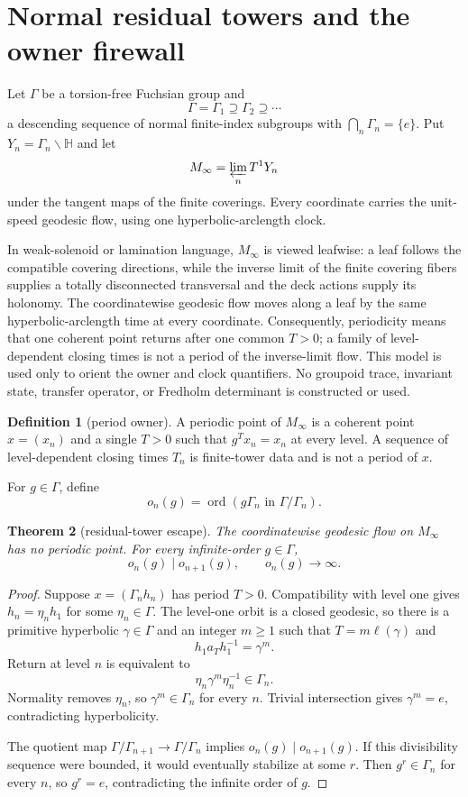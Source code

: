 \documentclass[11pt]{article}
\newtheorem{theorem}{Theorem}[section]
\theoremstyle{definition}
\newtheorem{definition}[theorem]{Definition}
\theoremstyle{remark}
\newcommand{\HH}{\mathbb H}
\newcommand{\ord}{\operatorname{ord}}
\begin{document}
\section{Normal residual towers and the owner firewall}

Let $\Gamma$ be a torsion-free Fuchsian group and
\[
\Gamma=\Gamma_1\supseteq\Gamma_2\supseteq\cdots
\]
a descending sequence of normal finite-index subgroups with
$\bigcap_n\Gamma_n=\{e\}$. Put $Y_n=\Gamma_n\backslash\HH$ and let
\[
M_\infty=\varprojlim_n T^1Y_n
\]
under the tangent maps of the finite coverings. Every coordinate carries the unit-speed geodesic flow, using one hyperbolic-arclength clock.

In weak-solenoid or lamination language, $M_\infty$ is viewed leafwise: a leaf follows the compatible covering directions, while the inverse limit of the finite covering fibers supplies a totally disconnected transversal and the deck actions supply its holonomy. The coordinatewise geodesic flow moves along a leaf by the same hyperbolic-arclength time at every coordinate. Consequently, periodicity means that one coherent point returns after one common $T>0$; a family of level-dependent closing times is not a period of the inverse-limit flow. This model is used only to orient the owner and clock quantifiers. No groupoid trace, invariant state, transfer operator, or Fredholm determinant is constructed or used.

\begin{definition}[period owner]
A periodic point of $M_\infty$ is a coherent point $x=(x_n)$ and a single $T>0$ such that $g^T x_n=x_n$ at every level. A sequence of level-dependent closing times $T_n$ is finite-tower data and is not a period of $x$.
\end{definition}

For $g\in\Gamma$, define
\[
o_n(g)=\ord(g\Gamma_n\text{ in }\Gamma/\Gamma_n).
\]

\begin{theorem}[residual-tower escape]\label{thm:residual}
The coordinatewise geodesic flow on $M_\infty$ has no periodic point. For every infinite-order $g\in\Gamma$,
\[
o_n(g)\mid o_{n+1}(g),
\qquad
o_n(g)\longrightarrow\infty.
\]
\end{theorem}

\begin{proof}
Suppose $x=(\Gamma_nh_n)$ has period $T>0$. Compatibility with level one gives $h_n=\eta_nh_1$ for some $\eta_n\in\Gamma$. The level-one orbit is a closed geodesic, so there is a primitive hyperbolic $\gamma\in\Gamma$ and an integer $m\geq1$ such that $T=m\ell(\gamma)$ and
\[
h_1a_Th_1^{-1}=\gamma^m.
\]
Return at level $n$ is equivalent to
\[
\eta_n\gamma^m\eta_n^{-1}\in\Gamma_n.
\]
Normality removes $\eta_n$, so $\gamma^m\in\Gamma_n$ for every $n$. Trivial intersection gives $\gamma^m=e$, contradicting hyperbolicity.

The quotient map $\Gamma/\Gamma_{n+1}\to\Gamma/\Gamma_n$ implies $o_n(g)\mid o_{n+1}(g)$. If this divisibility sequence were bounded, it would eventually stabilize at some $r$. Then $g^r\in\Gamma_n$ for every $n$, so $g^r=e$, contradicting the infinite order of $g$.
\end{proof}
\end{document}
